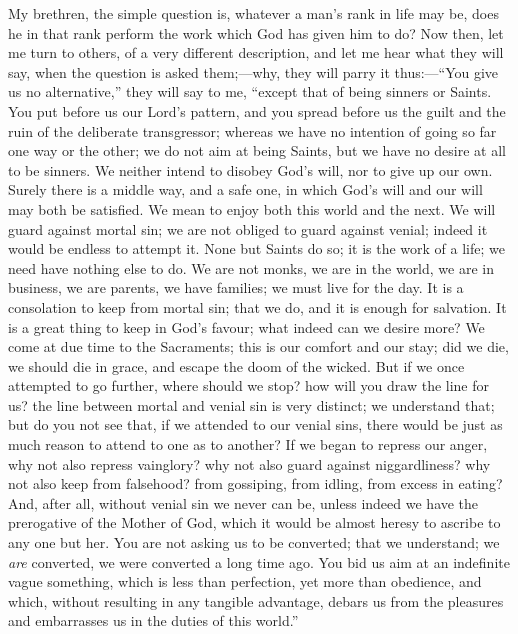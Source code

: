 My brethren, the simple question is, whatever a man's rank in life
may be, does he in that rank perform the work which God has given him
to do? Now then, let me turn to others, of a very different
description, and let me hear what they will say, when the question is
asked them;—why, they will parry it thus:—``You give us no
alternative,'' they will say to me, ``except that of being
sinners or Saints. You put before us our Lord's pattern, and you
spread before us the guilt and the ruin of the deliberate
transgressor; whereas we have no intention of going so far one way or
the other; we do not aim at being Saints, but we have no desire at all
to be sinners. We neither intend to disobey God's will, nor to give up
our own. Surely there is a middle way, and a safe one, in which God's
will and our will may both be satisfied. We mean to enjoy both this
world and the next. We will guard against mortal sin; we are not
obliged to guard against venial; indeed it would be endless to attempt
it. None but Saints do so; it is the work of a life; we need have
nothing else to do. We are not monks, we are in the world, we are in
business, we are parents, we have families; we must live for the day.
It is a consolation to keep from mortal sin; that we do, and it is
enough for salvation. It is a great thing to keep in God's favour;
what indeed can we desire more? We come at due time to the Sacraments;
this is our comfort and our stay; did we die, we should die in grace,
and escape the doom of the wicked. But if we once attempted to go
further, where should we stop? how will you draw the line for us? the
line between mortal and venial sin is very distinct; we understand
that; but do you not see that, if we attended to our venial sins,
there would be just as much reason to attend to one as to another? If
we began to repress our anger, why not also repress vainglory? why not
also guard against niggardliness? why not also keep from falsehood?
from gossiping, from idling, from excess in eating? And, after all,
without venial sin we never can be, unless indeed we have the
prerogative of the Mother of God, which it would be almost heresy to
ascribe to any one but her. You are not asking us to be converted;
that we understand; we \emph{are} converted, we were converted a long
time ago. You bid us aim at an indefinite vague something, which is
less than perfection, yet more than obedience, and which, without
resulting in any tangible advantage, debars us from the pleasures and
embarrasses us in the duties of this world.''

